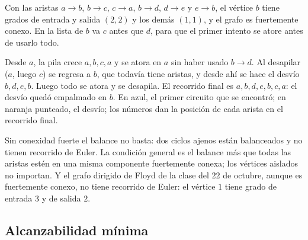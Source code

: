 \documentclass[11pt,letterpaper]{article}
\begin{document}
\begin{ejemplo}[Un empalme]
  \label{ej:euler-dirigido}
  Con las aristas $a \to b$, $b \to c$, $c \to a$, $b \to d$,
  $d \to e$ y $e \to b$, el vértice $b$ tiene grados de entrada y
  salida $(2, 2)$ y los demás $(1, 1)$, y el grafo es fuertemente
  conexo. En la lista de $b$ va $c$ antes que $d$, para que el primer
  intento se atore antes de usarlo todo.
  \begin{center}
  \end{center}
  Desde $a$, la pila crece $a, b, c, a$ y se atora en $a$ sin haber
  usado $b \to d$. Al desapilar ($a$, luego $c$) se regresa a $b$, que
  todavía tiene aristas, y desde ahí se hace el desvío $b, d, e, b$.
  Luego todo se atora y se desapila. El recorrido final es
  $a, b, d, e, b, c, a$: el desvío quedó empalmado en $b$. En azul, el
  primer circuito que se encontró; en naranja punteado, el desvío; los
  números dan la posición de cada arista en el recorrido final.
\end{ejemplo}

\begin{ojo}
  Sin conexidad fuerte el balance no basta: dos ciclos ajenos están
  balanceados y no tienen recorrido de Euler. La condición general es
  el balance más que todas las aristas estén en una misma componente
  fuertemente conexa; los vértices aislados no importan. Y el grafo
  dirigido de Floyd de la clase del 22 de octubre, aunque es
  fuertemente conexo, no tiene recorrido de Euler: el vértice $1$
  tiene grado de entrada $3$ y de salida $2$.
\end{ojo}


\subsection*{Alcanzabilidad mínima}
\end{document}
